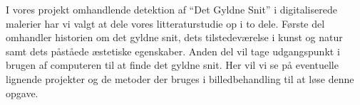 \textsf{I vores projekt omhandlende detektion af ``Det Gyldne Snit'' i
digitaliserede malerier har vi valgt at dele vores litteraturstudie op i
to dele. Første del omhandler historien om det gyldne snit, dets
tilstedeværelse i kunst og natur samt dets påståede æstetiske
egenskaber. Anden del vil tage udgangspunkt i brugen af computeren til
at finde det gyldne snit. Her vil vi se på eventuelle lignende
projekter og de metoder der bruges i billedbehandling til at løse
denne opgave.}

